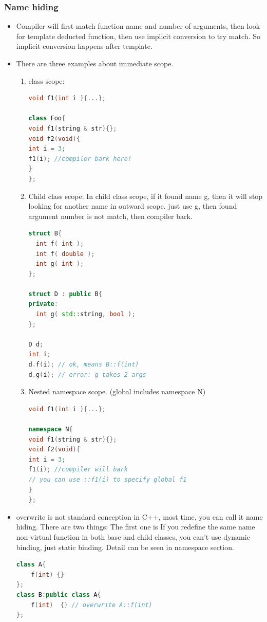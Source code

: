 \documentclass[a4paper,12pt,twoside]{book}
\begin{document}
\subsubsection{Name hiding}
\begin{itemize}

\item Compiler will first match function name and number of arguments, then look for template deducted function, then use implicit conversion to try match. So implicit conversion happens after template.

\item There are three examples about immediate scope.
\begin{enumerate}
\item class scope:
\begin{lstlisting}[frame=single, language=c++]
void f1(int i ){...};

class Foo{
void f1(string & str){};
void f2(void){
int i = 3;
f1(i); //compiler bark here!
}
};
\end{lstlisting}

\item Child class scope: In child class scope, if it found name g, then it will stop looking for another name in outward scope. just use g, then found argument number is not match, then compiler bark.
\begin{lstlisting}[frame=single, language=c++]
struct B{
  int f( int );
  int f( double );
  int g( int );
};

struct D : public B{
private:
  int g( std::string, bool );
};

D d;
int i;
d.f(i); // ok, means B::f(int)
d.g(i); // error: g takes 2 args
\end{lstlisting}

\item Nested namespace scope. (global includes namespace N)
\begin{lstlisting}[frame=single, language=c++]
void f1(int i ){...};

namespace N{
void f1(string & str){};
void f2(void){
int i = 3;
f1(i); //compiler will bark
// you can use ::f1(i) to specify global f1
}
};
\end{lstlisting}
\end{enumerate}


\item overwrite is not standard conception in C++, most time, you can call it name hiding. There are two things: The first one is If you redefine the same name non-virtual function in both base and child classes, you can't use dynamic binding, just static binding.  Detail can be seen in namespace section.
\begin{lstlisting}[frame=single, language=c++]
class A{
    f(int) {}
};
class B:public class A{
    f(int)  {} // overwrite A::f(int)
};


\end{lstlisting}
\end{itemize}
\end{document}
